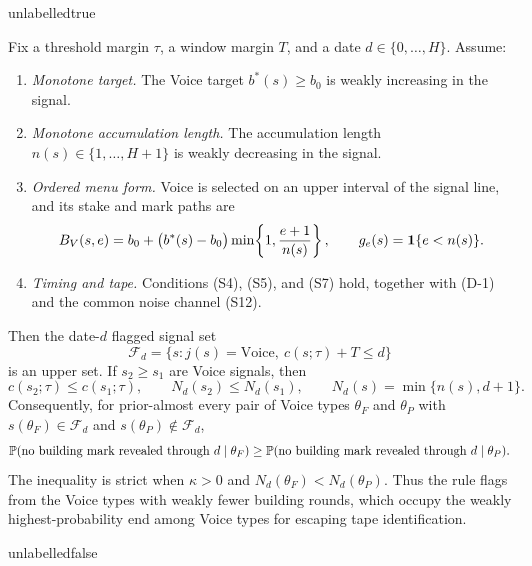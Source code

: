 \csname unlabelledtrue\endcsname
\begin{lemma}
\label{lem:upper-set}
Fix a threshold margin $\tau$, a window margin $T$, and a date
$d\in\{0,\ldots,H\}$. Assume:
\begin{enumerate}[label=(U-\arabic*),leftmargin=3.2em,itemsep=3pt]
\item \emph{Monotone target.} The Voice target $b^*(s)\ge b_0$ is weakly increasing in the
  signal.
\item \emph{Monotone accumulation length.} The accumulation length
  $n(s)\in\{1,\ldots,H+1\}$ is weakly decreasing in the signal.
\item \emph{Ordered menu form.} Voice is selected on an upper interval of the signal line, and
  its stake and mark paths are
  \[
    B_V(s,e)=b_0+\bigl(b^*(s)-b_0\bigr)
      \min\!\left\{1,\frac{e+1}{n(s)}\right\},
    \qquad
    g_e(s)=\mathbf{1}\{e<n(s)\}.
  \]
\item \emph{Timing and tape.} Conditions (S4), (S5), and (S7) hold, together with (D-1) and the
  common noise channel (S12).
\end{enumerate}
Then the date-$d$ flagged signal set
\begin{equation}
\label{eq:upper-flagged-set}
  \mathcal F_d
  =\{s:j(s)=\mathrm{Voice},\ c(s;\tau)+T\le d\}
\end{equation}
is an upper set. If $s_2\ge s_1$ are Voice signals, then
\[
  c(s_2;\tau)\le c(s_1;\tau),
  \qquad
  N_d(s_2)\le N_d(s_1),
  \qquad
  N_d(s)=\min\{n(s),d+1\}.
\]
Consequently, for prior-almost every pair of Voice types $\theta_F$ and $\theta_P$ with
$s(\theta_F)\in\mathcal F_d$ and
$s(\theta_P)\notin\mathcal F_d$,
\begin{equation}
\label{eq:upper-silence-order}
  \mathbb{P}(\text{no building mark revealed through }d\mid\theta_F)
  \ge
  \mathbb{P}(\text{no building mark revealed through }d\mid\theta_P).
\end{equation}
The inequality is strict when $\kappa>0$ and $N_d(\theta_F)<N_d(\theta_P)$. Thus the rule flags from
the Voice types with weakly fewer building rounds, which occupy the weakly highest-probability end
among Voice types for escaping tape identification.
\end{lemma}
\csname unlabelledfalse\endcsname

